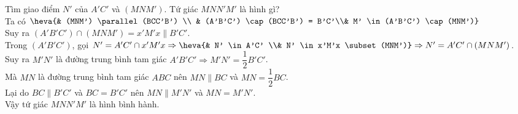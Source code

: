 \begin{vd}
{\begin{listEX}
{}
\item Tìm giao điểm $N'$ của $A'C'$ và $(MNM')$. Tứ giác $MNN'M'$ là hình gì?
\\ Ta có $\heva{& (MNM') \parallel (BCC'B') \\ & (A'B'C') \cap (BCC'B') = B'C'\\& M' \in (A'B'C') \cap (MNM')}$\\
Suy ra $(A'B'C') \cap (MNM') = x'M'x \parallel B'C'$.\\
Trong $(A'B'C')$, gọi $N' = A'C' \cap x'M'x \Rightarrow \heva{& N' \in A'C' \\& N' \in x'M'x \subset (MNM')}\Rightarrow N' = A'C' \cap (MNM')$.\\
Suy ra $M'N'$ là đường trung bình tam giác $A'B'C' \Rightarrow  M'N' =\dfrac{1}{2} B'C'$.\\
Mà $MN$ là đường trung bình tam giác $ABC$ nên $MN \parallel BC$ và $MN =\dfrac{1}{2} BC$.\\
Lại do $BC \parallel B'C'$ và $BC= B'C'$ nên $MN \parallel M'N'$ và $MN= M'N'$.\\
Vậy tứ giác $MNN'M'$  là hình bình hành.
\end{listEX}
}
\end{vd}

